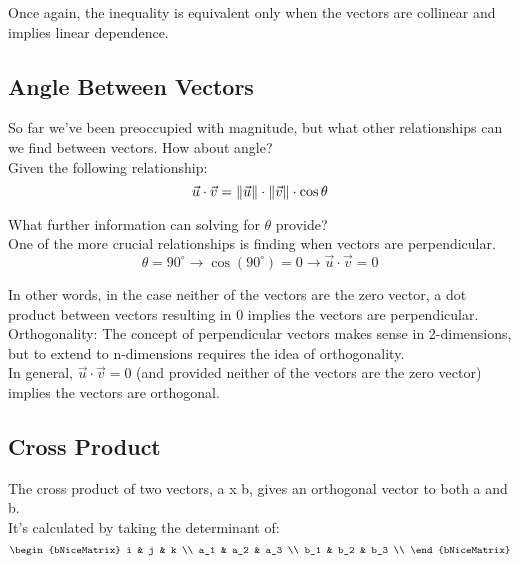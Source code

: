 Once again, the inequality is equivalent only when the vectors are collinear and implies linear dependence.


\subsection{Angle Between Vectors}\label{concept2.5}
So far we've been preoccupied with magnitude, but what other relationships can we find between vectors. How about angle?
\\

Given the following relationship:
\begin{equation}
	\vec{u} \cdot \vec{v} = \left\Vert \vec{u} \right\Vert \cdot \left\Vert \vec{v} \right\Vert \cdot \cos \theta
\end{equation}

What further information can solving for $\theta$ provide?
\\

One of the more crucial relationships is finding when vectors are perpendicular.
\begin{equation}
	\theta = 90^\circ \longrightarrow
	\cos (90^\circ) = 0 \longrightarrow
	\vec{u} \cdot \vec{v} = 0
\end{equation}

In other words, in the case neither of the vectors are the zero vector, a dot product between vectors resulting in 0 implies the vectors are perpendicular.
\\

Orthogonality: The concept of perpendicular vectors makes sense in 2-dimensions, but to extend to n-dimensions requires the idea of orthogonality.
\\

In general, $\vec{u} \cdot \vec{v} = 0$ (and provided neither of the vectors are the zero vector) implies the vectors are orthogonal.


\subsection{Cross Product}\label{concept2.6}
The cross product of two vectors, a x b, gives an orthogonal vector to both a and b.
\\
It's calculated by taking the determinant of:
\begin{equation}
	\begin{bNiceMatrix}
		i & j & k \\
		a_1 & a_2 & a_3 \\
		b_1 & b_2 & b_3 \\
	\end{bNiceMatrix}
\end{equation}

